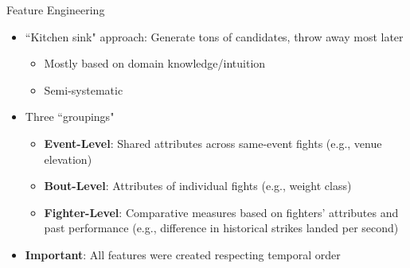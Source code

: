 \documentclass[aspectratio=169,xcolor=dvipsnames]{beamer}
\begin{document}

\begin{frame}{Feature Engineering}
    \begin{itemize}
        \item ``Kitchen sink" approach: Generate tons of candidates, throw away most later
        \begin{itemize}
            \item Mostly based on domain knowledge/intuition
            \item Semi-systematic
        \end{itemize}

        \item Three ``groupings"
        \begin{itemize}
            \item \textbf{Event-Level}: Shared attributes across same-event fights (e.g., venue elevation)

            \item \textbf{Bout-Level}: Attributes of individual fights (e.g., weight class)

            \item \textbf{Fighter-Level}: Comparative measures based on fighters' attributes and past performance (e.g., difference in historical strikes landed per second)
        \end{itemize}

        \item \textbf{Important}: All features were created respecting temporal order
    \end{itemize}
\end{frame}

\end{document}
